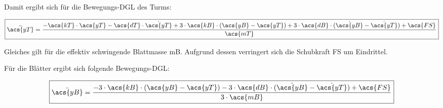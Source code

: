 Damit ergibt sich für die Bewegungs-DGL des Turms:

\begin{align}\label{eq:Gleichung 6.3}
    \boxed{\ddot{\acs{yT}}=\frac{-\acs{kT} \cdot \acs{yT}- \acs{dT} \cdot \dot{\acs{yT}}+ 3 \cdot \acs{kB} \cdot(\acs{yB}-\acs{yT})+ 3\cdot \acs{dB} \cdot (\dot{\acs{yB}}-\dot{\acs{yT}})+\acs{FS}} {\acs{mT}}}
\end{align}

Gleiches gilt für die effektiv schwingende Blattmasse \acs{mB}. Aufgrund dessen verringert sich die Schubkraft \acs{FS} um Eindrittel. 



Für die Blätter ergibt sich folgende Bewegungs-DGL:

\begin{align}\label{eq:Gleichung6.4}
    \boxed{\ddot{\acs{yB}}=\frac{-3 \cdot \acs{kB} \cdot(\acs{yB}-\acs{yT})-3 \cdot \acs{dB} \cdot (\dot{\acs{yB}}-\dot{\acs{yT}})+\acs{FS}} {3\cdot\acs{mB}}}
\end{align}
\newpage

